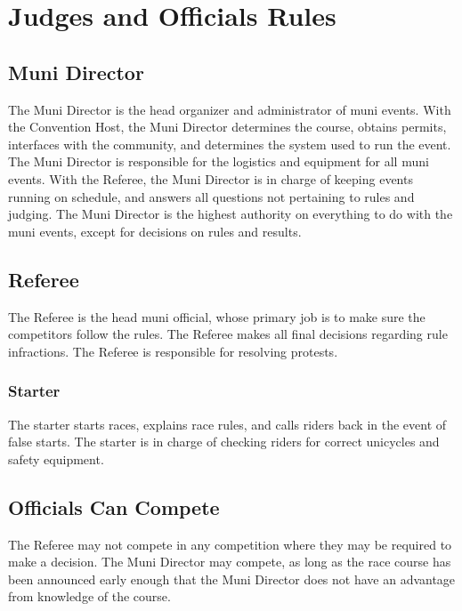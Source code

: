 \chapter{Judges and Officials Rules}

\section{Muni Director}

The Muni Director is the head organizer and administrator of muni events.
With the Convention Host, the Muni Director determines the course, obtains permits, interfaces with the community, and determines the system used to run the event.
The Muni Director is responsible for the logistics and equipment for all muni events.
With the Referee, the Muni Director is in charge of keeping events running on schedule, and answers all questions not pertaining to rules and judging.
The Muni Director is the highest authority on everything to do with the muni events, except for decisions on rules and results.

\section{Referee}

The Referee is the head muni official, whose primary job is to make sure the competitors follow the rules.
The Referee makes all final decisions regarding rule infractions.
The Referee is responsible for resolving protests.


\subsection{Starter}

The starter starts races, explains race rules, and calls riders back in the event of false starts.
The starter is in charge of checking riders for correct unicycles and safety equipment.

\section{Officials Can Compete}

The Referee may not compete in any competition where they may be required to make a decision.
The Muni Director may compete, as long as the race course has been announced early enough that the Muni Director does not have an advantage from knowledge of the course.
